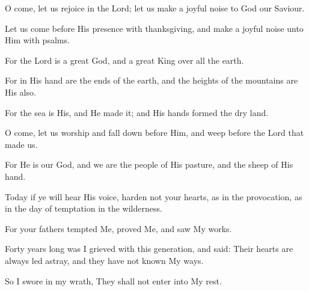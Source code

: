 O come, let us rejoice in the Lord; let us make a joyful noise to God our Saviour.

Let us come before His presence with thanksgiving, and make a joyful noise unto Him with psalms.

For the Lord is a great God, and a great King over all the earth.

For in His hand are the ends of the earth, and the heights of the mountains are His also.

For the sea is His, and He made it; and His hands formed the dry land.

O come, let us worship and fall down before Him, and weep before the Lord that made us.

For He is our God, and we are the people of His pasture, and the sheep of His hand.

Today if ye will hear His voice, harden not your hearts, as in the provocation, as in the day of temptation in the wilderness.

For your fathers tempted Me, proved Me, and saw My works.

Forty years long was I grieved with this generation, and said: Their hearts are always led astray, and they have not known My ways.

So I swore in my wrath, They shall not enter into My rest.
